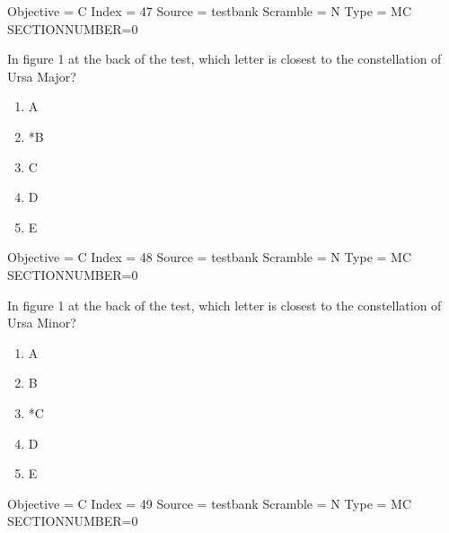 \documentclass[11pt]{article}
\begin{document}
\begin{enumerate}
\begin{minipage}{\textwidth}
\begin{minipage}{\textwidth}
Objective = C
Index = 47
Source = testbank
Scramble = N
Type = MC
SECTIONNUMBER=0
\end{minipage}
\end{minipage}
\vskip 0.20in

\begin{minipage}{\textwidth}
\begin{minipage}{\textwidth}
\item In figure 1 at the back of the test, which letter is closest to the constellation of Ursa Major?
\begin{multicols}{3}
\begin{enumerate} 
\setlength{\itemsep}{1pt} 
\setlength{\parskip}{0pt} 
\setlength{\parsep}{0pt}
\setlength{\multicolsep}{1pt} 
\item A
\item *B
\item C
\item D
\item E
\end{enumerate} 
\vfill 
\end{multicols}

Objective = C
Index = 48
Source = testbank
Scramble = N
Type = MC
SECTIONNUMBER=0
\end{minipage}
\end{minipage}
\vskip 0.20in

\begin{minipage}{\textwidth}
\begin{minipage}{\textwidth}
\item In figure 1 at the back of the test, which letter is closest to the constellation of Ursa Minor?
\begin{multicols}{3}
\begin{enumerate} 
\setlength{\itemsep}{1pt} 
\setlength{\parskip}{0pt} 
\setlength{\parsep}{0pt}
\setlength{\multicolsep}{1pt} 
\item A
\item B
\item *C
\item D
\item E
\end{enumerate} 
\vfill 
\end{multicols}

Objective = C
Index = 49
Source = testbank
Scramble = N
Type = MC
SECTIONNUMBER=0
\end{minipage}
\end{minipage}
\vskip 0.20in


\end{enumerate}
\end{document}
